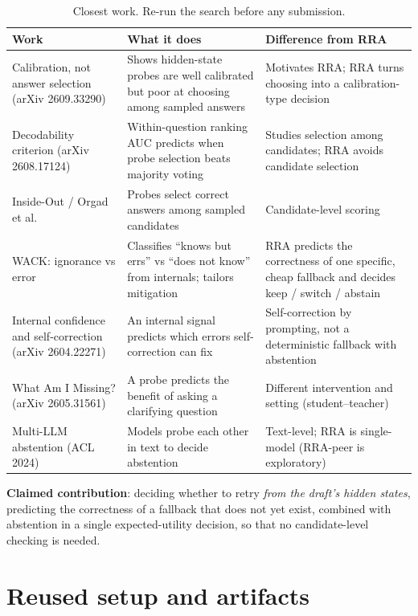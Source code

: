 \documentclass[11pt]{article}
\begin{document}
\begin{table}[H]
\centering
\small
\begin{tabularx}{\textwidth}{@{}lLL@{}}
\toprule
Work & What it does & Difference from RRA \\
\midrule
Calibration, not answer selection (arXiv 2609.33290) & Shows hidden-state probes are well calibrated but
  poor at choosing among sampled answers & Motivates RRA; RRA turns choosing into a calibration-type decision \\
Decodability criterion (arXiv 2608.17124) & Within-question ranking AUC predicts when probe selection beats
  majority voting & Studies selection among candidates; RRA avoids candidate selection \\
Inside-Out / Orgad et al.\ & Probes select correct answers among sampled candidates & Candidate-level scoring \\
WACK: ignorance vs error & Classifies ``knows but errs'' vs ``does not know'' from internals; tailors mitigation &
  RRA predicts the correctness of one specific, cheap fallback and decides keep / switch / abstain \\
Internal confidence and self-correction (arXiv 2604.22271) & An internal signal predicts which errors
  self-correction can fix & Self-correction by prompting, not a deterministic fallback with abstention \\
What Am I Missing? (arXiv 2605.31561) & A probe predicts the benefit of asking a clarifying question & Different
  intervention and setting (student--teacher) \\
Multi-LLM abstention (ACL 2024) & Models probe each other in text to decide abstention & Text-level; RRA is
  single-model (RRA-peer is exploratory) \\
\bottomrule
\end{tabularx}
\caption{Closest work. Re-run the search before any submission.}
\end{table}

\noindent\textbf{Claimed contribution}: deciding whether to retry \emph{from the draft's hidden states},
predicting the correctness of a fallback that does not yet exist, combined with abstention in a single
expected-utility decision, so that no candidate-level checking is needed.

\section{Reused setup and artifacts}
\end{document}
